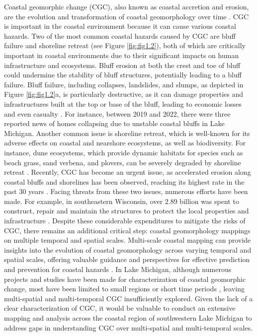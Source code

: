 Coastal geomorphic change (CGC), also known as coastal accretion and erosion,
are the evolution and transformation of coastal geomorphology over time
\citep{biswas_effects_2023}. CGC is important in the coastal environment because
it can cause various coastal hazards. Two of the most common coastal hazards
caused by CGC are bluff failure and shoreline retreat (see Figure
\ref{fig:fig1.2}), both of which are critically important in coastal
environments due to their significant impacts on human infrastructure and
ecosystems. Bluff erosion at both the crest and toe of bluff could undermine the
stability of bluff structures, potentially leading to a bluff failure. Bluff
failure, including collapses, landslides, and slumps, as depicted in Figure
\ref{fig:fig1.2}a, is particularly destructive, as it can damage properties and
infrastructures built at the top or base of the bluff, leading to economic
losses and even casualty \citep{deitz_bluff_2024}. For instance, between 2019
and 2022, there were three reported news
\citep{mitchell_geologist_2019,fromson_house_2020,koran_15_2022} of homes
collapsing due to unstable coastal bluffs in Lake Michigan. Another common issue
is shoreline retreat, which is well-known for its adverse effects on coastal and
nearshore ecosystems, as well as biodiversity. For instance, dune ecosystems,
which provide dynamic habitats for species such as beach grass, sand verbena,
and plovers, can be severely degraded by shoreline retreat
\citep{van_der_biest_dune_2017}. Recently, CGC has become an urgent issue, as
accelerated erosion along coastal bluffs and shorelines has been observed,
reaching its highest rate in the past 30 years
\citep{troy_rapid_2021,zoet_analysis_2017,gronewold_hydrological_2016}. Facing
threats from these two issues, numerous efforts have been made. For example, in
southeastern Wisconsin, over $2.89$ billion was spent to construct, repair and
maintain the structures to protect the local properties and infrastructure
\citep{sanders_2016_nodate}. Despite these considerable expenditures to
mitigate the risks of CGC, there remains an additional critical step: coastal
geomorphology mappings on multiple temporal and spatial scales. Multi-scale
coastal mapping can provide insights into the evolution of coastal geomorphology
across varying temporal and spatial scales, offering valuable guidance and
perspectives for effective prediction and prevention for coastal hazards
\citep{kolednik2014coastal,papakonstantinou2016coastline}. In Lake Michigan,
although numerous projects and studies have been made for characterization of
coastal geomorphic change, most have been limited to small regions
\citep[\eg][]{swenson_bluff_2006,kilibarda_70year_2015} or short time periods
\citep[\eg][]{lin_field_2014,theuerkauf_coastal_2019}, leaving multi-spatial and
multi-temporal CGC insufficiently explored. Given the lack of a clear
characterization of CGC, it would be valuable to conduct an extensive mapping
and analysis across the coastal region of southwestern Lake Michigan to address
gaps in understanding CGC over multi-spatial and multi-temporal scales.

